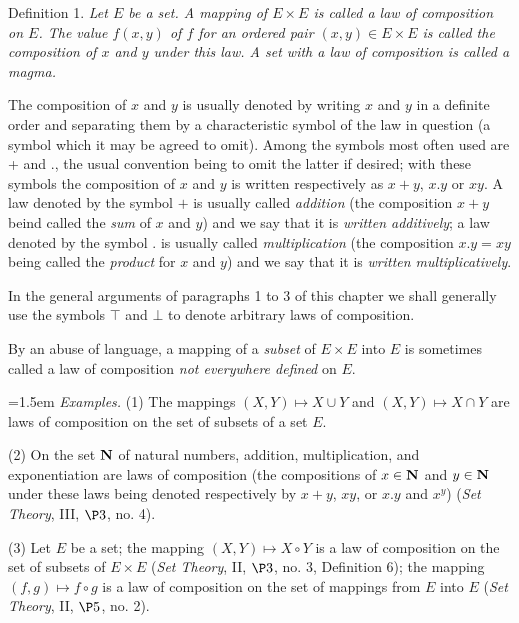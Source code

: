 \documentclass{article}
\begin{document}
\vspace{1em}\par\noindent
{\sc Definition 1.} {\em Let $E$ be a set. A mapping of $E\times E$ is called a
  law of composition on $E$. The value $f(x,y)$ of $f$ for an ordered pair
  $(x,y)\in E\times E$ is called the composition of $x$ and $y$ under this law. A
  set with a law of composition is called a magma.}  \vspace{1em}
      
The composition of $x$ and $y$ is usually denoted by writing $x$ and $y$ in a
definite order and separating them by a characteristic symbol of the law in
question (a symbol which it may be agreed to omit). Among the symbols most often
used are + and ., the usual convention being to omit the latter if desired; with
these symbols the composition of $x$ and $y$ is written respectively as $x+y$,
$x.y$ or $xy$. A law denoted by the symbol $+$ is usually called {\em addition}
(the composition $x+y$ beind called the {\em sum} of $x$ and $y$) and we say that
it is {\em written additively}; a law denoted by the symbol . is usually called
{\em multiplication} (the composition $x.y=xy$ being called the {\em product} for
$x$ and $y$) and we say that it is {\em written multiplicatively}.
      
In the general arguments of paragraphs 1 to 3 of this chapter we shall generally
use the symbols $\top$ and $\bot$ to denote arbitrary laws of composition.
      
By an abuse of language, a mapping of a {\em subset} of $E\times E$ into $E$ is
sometimes called a law of composition {\em not everywhere defined} on $E$.
\vspace{1em}
      
\strut\hfill
\begin{minipage}{11cm}\parindent=1.5em
  {\em Examples.} (1) The mappings $(X,Y)\mapsto X\cup Y$ and $(X,Y)\mapsto X\cap
  Y$ are laws of composition on the set of subsets of a set $E$.
  
  (2) On the set $\bf N$ of natural numbers, addition, multiplication, and
  exponentiation are laws of composition (the compositions of $x\in{\bf N}$ and
  $y\in{\bf N}$ under these laws being denoted respectively by $x+y$, $xy$, or
  $x.y$ and $x^y$) ({\em Set Theory}, III, $\P3$, no. 4).
  
  (3) Let $E$ be a set; the mapping $(X,Y)\mapsto X\circ Y$ is a law of
  composition on the set of subsets of $E\times E$ ({\em Set Theory}, II, $\P3$,
  no. 3, Definition 6); the mapping $(f,g)\mapsto f\circ g$ is a law of
  composition on the set of mappings from $E$ into $E$ ({\em Set Theory}, II,
  $\P5$, no. 2).
\end{minipage}
\end{document}
